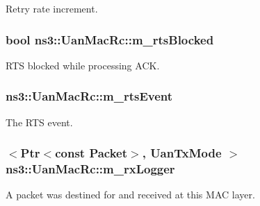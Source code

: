 Retry rate increment. 

\subsubsection[{\texorpdfstring{m\+\_\+rts\+Blocked}{m_rtsBlocked}}]{\setlength{\rightskip}{0pt plus 5cm}bool ns3\+::\+Uan\+Mac\+Rc\+::m\+\_\+rts\+Blocked\hspace{0.3cm}{\ttfamily [private]}}\hypertarget{classns3_1_1UanMacRc_aa85fcd87a24f6ebb5425cbd5f08a6205}{}\label{classns3_1_1UanMacRc_aa85fcd87a24f6ebb5425cbd5f08a6205}


R\+TS blocked while processing A\+CK. 

\subsubsection[{\texorpdfstring{m\+\_\+rts\+Event}{m_rtsEvent}}]{ ns3\+::\+Uan\+Mac\+Rc\+::m\+\_\+rts\+Event\hspace{0.3cm}{\ttfamily [private]}}\hypertarget{classns3_1_1UanMacRc_a3e6d714bfb2a91d1f7c117e55e128487}{}\label{classns3_1_1UanMacRc_a3e6d714bfb2a91d1f7c117e55e128487}
The R\+TS event. 
\subsubsection[{\texorpdfstring{m\+\_\+rx\+Logger}{m_rxLogger}}]{$<${\bf Ptr}$<$const {\bf Packet}$>$, {\bf Uan\+Tx\+Mode} $>$ ns3\+::\+Uan\+Mac\+Rc\+::m\+\_\+rx\+Logger\hspace{0.3cm}{\ttfamily [private]}}\hypertarget{classns3_1_1UanMacRc_ac1ad814ae22d6cea426cc5ca46089856}{}\label{classns3_1_1UanMacRc_ac1ad814ae22d6cea426cc5ca46089856}
A packet was destined for and received at this M\+AC layer. 
